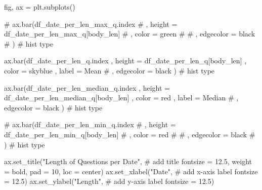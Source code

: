 \documentclass[
  letterpaper,
  DIV=11,
  numbers=noendperiod]{scrartcl}
\newenvironment{Shaded}{\begin{snugshade}}{\end{snugshade}}
\newcommand{\CommentTok}[1]{\textcolor[rgb]{0.37,0.37,0.37}{#1}}
\newcommand{\DecValTok}[1]{\textcolor[rgb]{0.68,0.00,0.00}{#1}}
\newcommand{\FloatTok}[1]{\textcolor[rgb]{0.68,0.00,0.00}{#1}}
\newcommand{\NormalTok}[1]{\textcolor[rgb]{0.00,0.23,0.31}{#1}}
\newcommand{\OperatorTok}[1]{\textcolor[rgb]{0.37,0.37,0.37}{#1}}
\newcommand{\StringTok}[1]{\textcolor[rgb]{0.13,0.47,0.30}{#1}}
\begin{document}
\begin{Shaded}
\begin{Highlighting}[]
\NormalTok{fig, ax }\OperatorTok{=}\NormalTok{ plt.subplots()}


\CommentTok{\# ax.bar(df\_date\_per\_len\_max\_q.index}
\CommentTok{\#     ,  height = df\_date\_per\_len\_max\_q[\textquotesingle{}body\_len\textquotesingle{}]}
\CommentTok{\#     ,  color = \textquotesingle{}green\textquotesingle{}}
\CommentTok{\#     \# ,  edgecolor = \textquotesingle{}black\textquotesingle{}}
\CommentTok{\#       ) \# hist type}

\NormalTok{ax.bar(df\_date\_per\_len\_q.index}
\NormalTok{    ,  height }\OperatorTok{=}\NormalTok{ df\_date\_per\_len\_q[}\StringTok{\textquotesingle{}body\_len\textquotesingle{}}\NormalTok{]}
\NormalTok{    ,  color }\OperatorTok{=} \StringTok{\textquotesingle{}skyblue\textquotesingle{}}
\NormalTok{    ,  label }\OperatorTok{=} \StringTok{\textquotesingle{}Mean\textquotesingle{}}
    \CommentTok{\# ,  edgecolor = \textquotesingle{}black\textquotesingle{}}
\NormalTok{      ) }\CommentTok{\# hist type}

\NormalTok{ax.bar(df\_date\_per\_len\_median\_q.index}
\NormalTok{    ,  height }\OperatorTok{=}\NormalTok{ df\_date\_per\_len\_median\_q[}\StringTok{\textquotesingle{}body\_len\textquotesingle{}}\NormalTok{]}
\NormalTok{    ,  color }\OperatorTok{=} \StringTok{\textquotesingle{}red\textquotesingle{}}
\NormalTok{    ,  label }\OperatorTok{=} \StringTok{\textquotesingle{}Median\textquotesingle{}}
    \CommentTok{\# ,  edgecolor = \textquotesingle{}black\textquotesingle{}}
\NormalTok{      ) }\CommentTok{\# hist type}


\CommentTok{\# ax.bar(df\_date\_per\_len\_min\_q.index}
\CommentTok{\#     ,  height = df\_date\_per\_len\_min\_q[\textquotesingle{}body\_len\textquotesingle{}]}
\CommentTok{\#     ,  color = \textquotesingle{}red\textquotesingle{}}
\CommentTok{\#     \# ,  edgecolor = \textquotesingle{}black\textquotesingle{}}
\CommentTok{\#       ) \# hist type}

\NormalTok{ax.set\_title(}\StringTok{"Length of Questions per Date"}\NormalTok{, }\CommentTok{\# add title}
\NormalTok{             fontsize }\OperatorTok{=} \FloatTok{12.5}\NormalTok{,}
\NormalTok{             weight }\OperatorTok{=} \StringTok{\textquotesingle{}bold\textquotesingle{}}\NormalTok{,}
\NormalTok{             pad }\OperatorTok{=} \DecValTok{10}\NormalTok{,}
\NormalTok{             loc }\OperatorTok{=} \StringTok{\textquotesingle{}center\textquotesingle{}}\NormalTok{)}
\NormalTok{ax.set\_xlabel(}\StringTok{"Date"}\NormalTok{, }\CommentTok{\# add x{-}axis label}
\NormalTok{              fontsize }\OperatorTok{=} \FloatTok{12.5}\NormalTok{)}
\NormalTok{ax.set\_ylabel(}\StringTok{"Length"}\NormalTok{, }\CommentTok{\# add y{-}axis label}
\NormalTok{              fontsize }\OperatorTok{=} \FloatTok{12.5}\NormalTok{)}


\end{Highlighting}
\end{Shaded}
\end{document}
